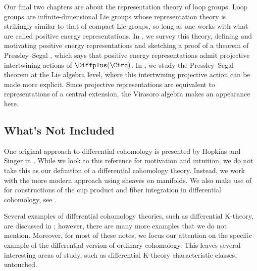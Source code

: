 Our final two chapters are about the representation theory of loop groups. Loop groups are infinite-dimensional Lie
groups whose representation theory is strikingly similar to that of compact Lie groups, so long as one works with
what are called positive energy representations. In , we survey this theory, defining and
motivating positive energy representations and sketching a proof of a theorem of Pressley--Segal \cite{loop}, which
says that positive energy representations admit projective intertwining actions of $\Diffplus(\Circ)$.
In
, we study the Pressley--Segal theorem at the Lie algebra level, where this intertwining
projective action can be made more explicit. Since projective representations are equivalent to representations of
a central extension, the Virasoro algebra makes an appearance here.


\subsection{What's Not Included}

One %
original approach to differential cohomology is presented by Hopkins and Singer in \cite{HopkinsSinger}. 
While we look to this reference for motivation and intuition, 
we do not take this as our definition of a differential cohomology theory. 
Instead, we work with the more modern approach using sheaves on manifolds. 
We also make use of \cite{HopkinsSinger} for constructions of the cup product and fiber integration in differential cohomology, see . 

Several examples of differential cohomology theories, such as differential K-theory, are discussed in ; 
however, there are many more examples that we do not mention. %
Moreover, for most of these notes, we focus our attention on the specific example of the differential version of ordinary cohomology. 
This leaves several interesting areas of study, such as differential K-theory characteristic classes, untouched.

